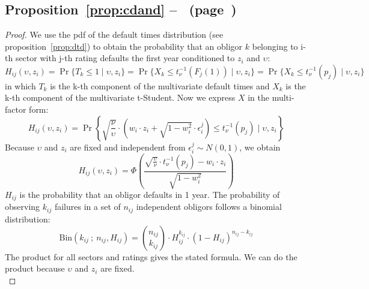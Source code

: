 \documentclass[11pt,fleqn]{book} %
\begin{document}
\section{}

\subsection{Proposition~\ref{prop:cdand} --~ (page~\pageref{prop:cdand})}
\begin{proof}
	We use the pdf of the default times distribution (see 
	proposition~\ref{prop:dtd}) to obtain the probability that an obligor 
	$k$ belonging to i-th sector with j-th rating defaults the first year 
	conditioned to $z_i$ and $\upsilon$:
	\begin{displaymath}
		H_{ij}(\upsilon,z_i) = 
		\Pr\{T_k \le 1 \mid \upsilon, z_i\} = 
		\Pr\{ X_k \le t_{\nu}^{-1}(F_j(1)) \mid \upsilon, z_i\} = 
		\Pr\{ X_k \le t_{\nu}^{-1}(p_j) \mid \upsilon, z_i\}
	\end{displaymath}
	in which $T_k$ is the k-th component of the multivariate default times 
	and $X_k$ is the k-th component of the multivariate t-Student. 
	Now we express $X$ in the multi-factor form:
	\begin{displaymath}
		H_{ij}(\upsilon,z_i) = \Pr \left\{ 
		\sqrt{\frac{\nu}{\upsilon}} \cdot \left( w_i \cdot z_i + \sqrt{1-w_i^2} \cdot \epsilon_i^j\right)
		\le t_{\nu}^{-1}(p_j) \mid \upsilon, z_i
		\right\}
	\end{displaymath}
	Because $\upsilon$ and $z_i$ are fixed and independent from 
	$\epsilon_i^j \sim N(0,1)$, we obtain
	\begin{displaymath}
		H_{ij}(\upsilon,z_i) = \Phi\left(  
		\frac{\sqrt{\frac{\upsilon}{\nu}} \cdot t_{\nu}^{-1}(p_j) - w_i\cdot z_i}{\sqrt{1-w_i^2}}
		\right)
	\end{displaymath}
	$H_{ij}$ is the probability that an obligor defaults in 1 year. The 
	probability of observing $k_{ij}$ failures in a set of $n_{ij}$ independent
	obligors follows a binomial distribution:
	\begin{displaymath}
		\text{Bin}(k_{ij}\ ;\ n_{ij},H_{ij}) = 
		\binom{n_{ij}}{k_{ij}} \cdot H_{ij}^{k_{ij}} \cdot (1-H_{ij})^{n_{ij}-k_{ij}}
	\end{displaymath}
	The product for all sectors and ratings gives the stated formula. 
	We can do the product because $\upsilon$ and $z_i$ are fixed.
	\\
\end{proof}






\end{document}
